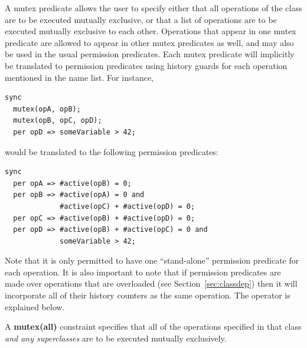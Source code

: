 \documentclass{overturerepchap}
\newcommand{\keyw}[1]{{\bf\ttfamily #1}}
\begin{document}
\begin{description}
A mutex predicate allows the user to specify either that all
operations of the class are to be executed mutually exclusive, or that
a list of operations are to be executed mutually exclusive to each
other. Operations that appear in one mutex predicate are allowed to
appear in other mutex predicates as well, and may also be used in the
usual permission predicates. Each mutex predicate will implicitly be
translated to permission predicates using history guards for each
operation mentioned in the name list. For instance,  
\begin{lstlisting}
sync
  mutex(opA, opB);
  mutex(opB, opC, opD);
  per opD => someVariable > 42;
\end{lstlisting}
would be translated to the following permission predicates: 
\begin{lstlisting}
sync
  per opA => #active(opB) = 0;
  per opB => #active(opA) = 0 and
             #active(opC) + #active(opD) = 0;
  per opC => #active(opB) + #active(opD) = 0;
  per opD => #active(opB) + #active(opC) = 0 and
             someVariable > 42;
\end{lstlisting}

Note that it is only permitted to have one ``stand-alone'' permission
predicate for each operation. It is also important to note that if
permission predicates are made over operations that are overloaded
(see Section~\ref{sec:classdep}) then it will incorporate all of their history
counters as the same operation. The {\bf{}} operator
is explained below.

A \keyw{mutex(all)} constraint specifies that all of the operations
specified in that class \textit{and any superclasses} are to be
executed mutually exclusively. 
\end{description}
\end{document}
